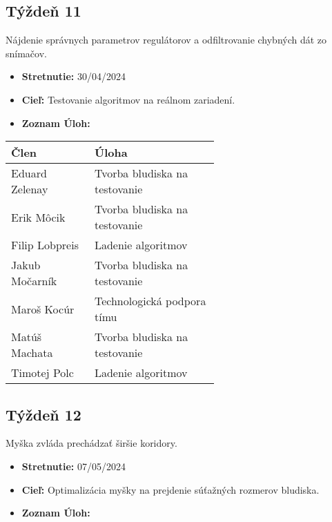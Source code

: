 \subsection{Týždeň 11}
Nájdenie správnych parametrov regulátorov a odfiltrovanie chybných dát zo snímačov.
\begin{itemize}
    \item \textbf{Stretnutie:} 30/04/2024
    \item \textbf{Cieľ: } Testovanie algoritmov na reálnom zariadení.
    \item \textbf{Zoznam Úloh:}
\end{itemize}

\begin{table}[H]
    \centering
    \begin{tabular}{|l|p{0.6\linewidth}|}
        \hline
        \textbf{Člen} & \textbf{Úloha} \\
        \hline
        Eduard Zelenay & Tvorba bludiska na testovanie \\
        \hline
        Erik Môcik & Tvorba bludiska na testovanie \\
        \hline
        Filip Lobpreis & Ladenie algoritmov \\
        \hline
        Jakub Močarník & Tvorba bludiska na testovanie \\
        \hline
        Maroš Kocúr & Technologická podpora tímu \\
        \hline
        Matúš Machata & Tvorba bludiska na testovanie \\
        \hline
        Timotej Polc & Ladenie algoritmov \\
        \hline
    \end{tabular}
\end{table}

\subsection{Týždeň 12}
Myška zvláda prechádzať širšie koridory.
\begin{itemize}
    \item \textbf{Stretnutie:} 07/05/2024
    \item \textbf{Cieľ:} Optimalizácia myšky na prejdenie súťažných rozmerov bludiska.
    \item \textbf{Zoznam Úloh:}
\end{itemize}

